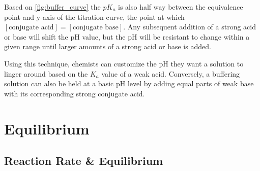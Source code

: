 \documentclass[10pt]{article}
\begin{document}
    Based on \autoref{fig:buffer_curve} the $pK_a$ is also half way between the equivalence point and y-axis of the titration curve, the point at which $[\text{conjugate acid}] = [\text{conjugate base}]$. Any subsequent addition of a strong acid or base will shift the pH value, but the pH will be resistant to change within a given range until larger amounts of a strong acid or base is added.

    Using this technique, chemists can customize the pH they want a solution to linger around based on the $K_a$ value of a weak acid. Conversely, a buffering solution can also be held at a basic pH level by adding equal parts of weak base with its corresponding strong conjugate acid.
   
\section{Equilibrium}
  \label{sec:equilibrium}

  \subsection{Reaction Rate \& Equilibrium}
\end{document}
